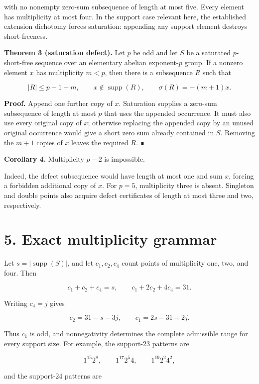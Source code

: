 \documentclass[
  11pt,
]{article}
\begin{document}
with no nonempty zero-sum subsequence of length at most five. Every
element has multiplicity at most four. In the support case relevant
here, the established extension dichotomy forces saturation: appending
any support element destroys short-freeness.

\textbf{Theorem 3 (saturation defect).} Let \(p\) be odd and let \(S\)
be a saturated \(p\)-short-free sequence over an elementary abelian
exponent-\(p\) group. If a nonzero element \(x\) has multiplicity
\(m<p\), then there is a subsequence \(R\) such that

\[
|R|\le p-1-m,
\qquad x\notin\operatorname{supp}(R),
\qquad \sigma(R)=-(m+1)x.
\]

\textbf{Proof.} Append one further copy of \(x\). Saturation supplies a
zero-sum subsequence of length at most \(p\) that uses the appended
occurrence. It must also use every original copy of \(x\); otherwise
replacing the appended copy by an unused original occurrence would give
a short zero sum already contained in \(S\). Removing the \(m+1\) copies
of \(x\) leaves the required \(R\). ∎

\textbf{Corollary 4.} Multiplicity \(p-2\) is impossible.

Indeed, the defect subsequence would have length at most one and sum
\(x\), forcing a forbidden additional copy of \(x\). For \(p=5\),
multiplicity three is absent. Singleton and double points also acquire
defect certificates of length at most three and two, respectively.

\hypertarget{exact-multiplicity-grammar}{%
\section{5. Exact multiplicity
grammar}\label{exact-multiplicity-grammar}}

Let \(s=|\operatorname{supp}(S)|\), and let \(c_1, c_2, c_4\) count
points of multiplicity one, two, and four. Then

\[
c_1+c_2+c_4=s,
\qquad
c_1+2c_2+4c_4=31.
\]

Writing \(c_4=j\) gives

\[
c_2=31-s-3j,
\qquad
c_1=2s-31+2j.
\]

Thus \(c_1\) is odd, and nonnegativity determines the complete
admissible range for every support size. For example, the support-23
patterns are

\[
1^{15}2^8, \qquad 1^{17}2^5 4, \qquad 1^{19}2^2 4^2,
\]

and the support-24 patterns are
\end{document}
